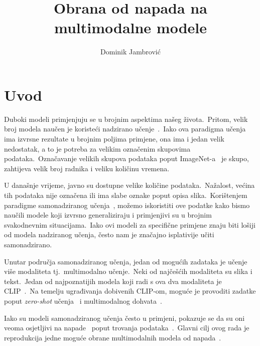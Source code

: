 \documentclass[times, utf8, seminar, numeric]{fer}
\begin{document}
\title{Obrana od napada na multimodalne modele}

\author{Dominik Jambrović}


\maketitle

\tableofcontents

\chapter{Uvod}

Duboki modeli primjenjuju se u brojnim aspektima našeg života.\ Pritom, velik broj modela naučen je koristeći nadzirano učenje~\cite{tian2022comprehensive}.\ 
Iako ova paradigma učenja ima izvrsne rezultate u brojnim poljima primjene, ona ima i jedan velik nedostatak, a to je potreba za velikim označenim skupovima podataka.\ 
Označavanje velikih skupova podataka poput ImageNet-a~\cite{deng2009imagenet} je skupo, zahtijeva velik broj radnika i veliku količinu vremena.\ 
  
U današnje vrijeme, javno su dostupne velike količine podataka.\ Nažalost, većina tih podataka nije označena ili ima slabe oznake poput opisa slika.\ 
Korištenjem paradigme samonadziranog učenja~\cite{liu2021self}, možemo iskoristiti ove podatke kako bismo naučili modele koji izvrsno generaliziraju i primjenjivi su u brojnim svakodnevnim situacijama.\ 
Iako ovi modeli za specifične primjene znaju biti lošiji od modela nadziranog učenja, često nam je značajno isplativije učiti samonadzirano.\ 

Unutar područja samonadziranog učenja, jedan od mogućih zadataka je učenje više modaliteta tj.\ multimodalno učenje.\ Neki od najčešćih modaliteta su slika i tekst.\ 
Jedan od najpoznatijih modela koji radi s ova dva modaliteta je CLIP~\cite{radford2021learning}.\ Na temelju ugrađivanja dobivenih CLIP-om, moguće je provoditi zadatke poput \textit{zero-shot} učenja~\cite{xian2018zero} i multimodalnog dohvata~\cite{wang2016comprehensive}.\
  
Iako su modeli samonadziranog učenja često u primjeni, pokazuje se da su oni veoma osjetljivi na napade~\cite{carlini2024poisoning} poput trovanja podataka~\cite{chen2017targeted}.\ 
Glavni cilj ovog rada je reprodukcija jedne moguće obrane multimodalnih modela od napada~\cite{yang2023better}.\
\end{document}
